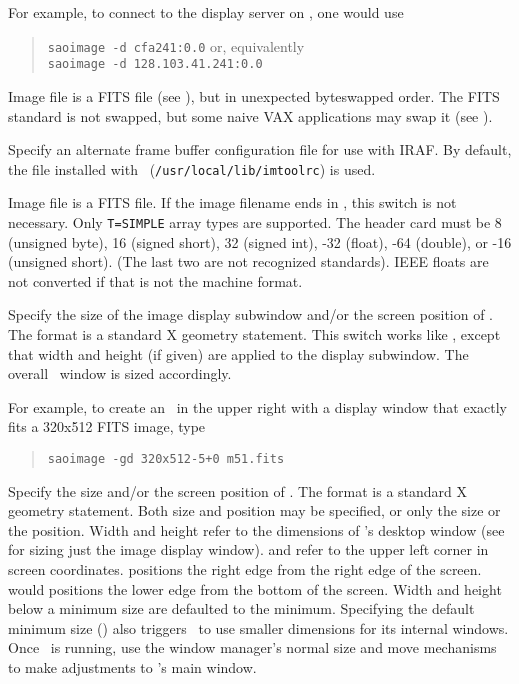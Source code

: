 \begin{description}
For example, to connect to the display server on , one would use
\begin{quote}
\verb"saoimage -d cfa241:0.0" \qquad or, equivalently\\
\verb"saoimage -d 128.103.41.241:0.0"
\end{quote}


Image file is a FITS file (see ), but in unexpected byteswapped
order.  The FITS standard is not swapped, but some naive VAX
applications may swap it (see ).


Specify an alternate frame buffer configuration file for use with IRAF.
By default, the file installed with \SAO\ (\verb"/usr/local/lib/imtoolrc")
is used.


Image file is a FITS file.  If the image filename ends in ,
this switch is not necessary.  Only \verb"T=SIMPLE" array types are
supported.  The header  card must be 8 (unsigned byte), 16
(signed short), 32 (signed int), -32 (float), -64 (double), or
-16 (unsigned short).  (The last two are not recognized standards).
IEEE floats are not converted if that is not the machine format.


Specify the size of the image display subwindow and/or the
screen position of \SAO.  The format is a standard X
geometry statement.  This switch works like , except
that width and height (if given) are applied to the display
subwindow.  The overall \SAO\ window is sized accordingly.

For example, to create an \SAO\ in the upper right with a display
window that exactly fits a 320x512 FITS image, type
\begin{quote}
\verb"saoimage -gd 320x512-5+0 m51.fits"
\end{quote}


Specify the size and/or the screen position of \SAO.  The
format is a standard X geometry statement.  Both size and
position may be specified, or only the size or the position.
Width and height refer to the dimensions of \SAO's desktop
window (see  for sizing just the image display window).
 and  refer to the
upper left corner in screen coordinates.
 positions the right edge from the right edge of the screen.
 would positions the lower edge from the bottom of the screen.
Width and height below a minimum size are defaulted to the minimum.
Specifying the default minimum size (\hbox{})
also triggers \SAO\ to use smaller dimensions for its internal windows.
Once \SAO\ is running, use the window
manager's normal size and move mechanisms to make adjustments
to \SAO's main window.


\end{description}
